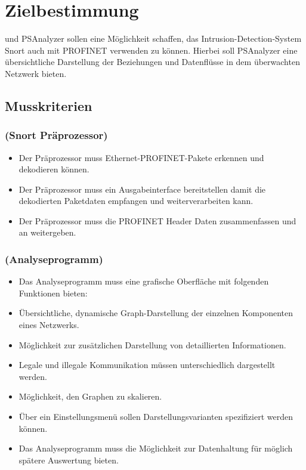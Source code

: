 \chapter{Zielbestimmung}

\programname und PSAnalyzer sollen eine Möglichkeit schaffen, das Intrusion-Detection-System Snort auch mit PROFINET verwenden zu können.
Hierbei soll PSAnalyzer eine übersichtliche Darstellung der Beziehungen und Datenflüsse in dem überwachten Netzwerk bieten.

\section{Musskriterien}

\subsection{\sppname (Snort Präprozessor)}

\begin{itemize}
\item Der Präprozessor muss Ethernet-PROFINET-Pakete erkennen und dekodieren können.

\item Der Präprozessor muss ein Ausgabeinterface bereitstellen damit \programname die dekodierten Paketdaten empfangen und weiterverarbeiten kann.

\item Der Präprozessor muss die PROFINET Header Daten zusammenfassen und an \programname weitergeben.
\end{itemize}

\subsection{\programname (Analyseprogramm)}

\begin{itemize}
\item Das Analyseprogramm muss eine grafische Oberfläche mit folgenden Funktionen bieten:

\item Übersichtliche, dynamische Graph-Darstellung der einzelnen Komponenten eines Netzwerks.

\item Möglichkeit zur zusätzlichen Darstellung von detaillierten Informationen.

\item Legale und illegale Kommunikation müssen unterschiedlich dargestellt werden.

\item Möglichkeit, den Graphen zu skalieren.

\item Über ein Einstellungsmenü sollen Darstellungsvarianten spezifiziert werden können.

\item Das Analyseprogramm muss die Möglichkeit zur Datenhaltung für möglich spätere Auswertung bieten.
\end{itemize}

